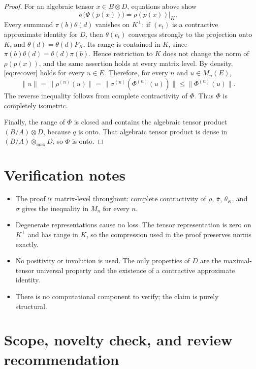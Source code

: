 \documentclass[11pt]{article}
\newcommand{\otmax}{\mathbin{\otimes_{\max}}}
\begin{document}
\begin{proof}
For an algebraic tensor $x\in B\otimes D$, equations above show
\begin{equation}\label{eq:recover}
 \sigma\bigl(\Phi(p(x))\bigr)=\rho(p(x))|_K.
\end{equation}
Every summand $\pi(b)\theta(d)$ vanishes on $K^\perp$: if $(e_t)$ is a
contractive approximate identity for $D$, then
$\theta(e_t)$ converges strongly to the projection onto $K$, and
$\theta(d)=\theta(d)P_K$.  Its range is contained in $K$, since
$\pi(b)\theta(d)=\theta(d)\pi(b)$.  Hence restriction to $K$ does not change
the norm of $\rho(p(x))$, and the same assertion holds at every matrix level.
By density, \eqref{eq:recover} holds for every $u\in E$.  Therefore, for every
$n$ and $u\in M_n(E)$,
\[
 \|u\|
 =\|\rho^{(n)}(u)\|
 =\|\sigma^{(n)}(\Phi^{(n)}(u))\|
 \le \|\Phi^{(n)}(u)\|.
\]
The reverse inequality follows from complete contractivity of $\Phi$.
Thus $\Phi$ is completely isometric.

Finally, the range of $\Phi$ is closed and contains the algebraic tensor
product $(B/A)\otimes D$, because $q$ is onto.  That algebraic tensor product
is dense in $(B/A)\otmax D$, so $\Phi$ is onto.
\end{proof}

\section{Verification notes}

\begin{itemize}
\item The proof is matrix-level throughout: complete contractivity of
$\rho$, $\overline\pi$, $\theta_K$, and $\sigma$ gives the inequality in
$M_n$ for every $n$.
\item Degenerate representations cause no loss.  The tensor representation
is zero on $K^\perp$ and has range in $K$, so the compression used in the
proof preserves norms exactly.
\item No positivity or involution is used.  The only properties of $D$ are
the maximal-tensor universal property and the existence of a contractive
approximate identity.
\item There is no computational component to verify; the claim is purely
structural.
\end{itemize}

\section{Scope, novelty check, and review recommendation}
\end{document}
